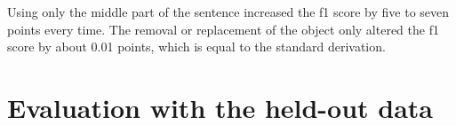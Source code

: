 Using only the middle part of the sentence increased the f1 score by five to seven points every time. The removal or replacement of the object only altered the f1 score by about 0.01 points, which is equal to the standard derivation.


\section{Evaluation with the held-out data}
\label{sec:final}

